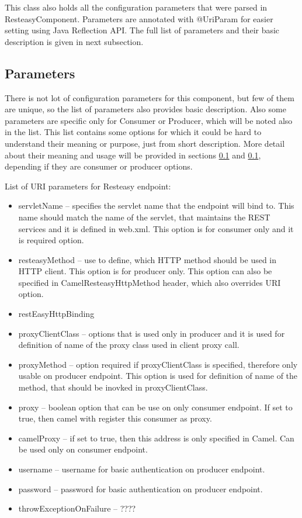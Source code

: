 \documentclass[12pt,final,oneside]{fithesis2}
\begin{document}
This class also holds all the configuration parameters that were parsed in ResteasyComponent. Parameters are annotated with @UriParam for easier setting using Java Reflection API. The full list of parameters and their basic description is given in next subsection.

\subsection{Parameters}
There is not lot of configuration parameters for this component, but few of them are unique, so the list of parameters also provides basic description. Also some parameters are specific only for Consumer or Producer, which will be noted also in the list. This list contains some options for which it could be hard to understand their meaning or purpose, just from short description. More detail about their meaning and usage will be provided in sections \ref{} and \ref{}, depending if they are consumer or producer options.  

List of URI parameters for Resteasy endpoint:
\begin{itemize}
\item
servletName -- specifies the servlet name that the endpoint will bind to. This name should match the name of the servlet, that maintains the REST services and it is defined in web.xml. This option is for consumer only and it is required option. 

\item
resteasyMethod -- use to define, which HTTP method should be used in HTTP client. This option is for producer only. This option can also be specified in CamelResteasyHttpMethod header, which also overrides URI option.

\item
restEasyHttpBinding

\item
proxyClientClass -- options that is used only in producer and it is used for definition of name of the proxy class used in client proxy call.

\item    
proxyMethod -- option required if proxyClientClass is specified, therefore only usable on producer endpoint. This option is used for definition of name of the method, that should be inovked in proxyClientClass.

\item
proxy -- boolean option that can be use on only consumer endpoint. If set to true, then camel with register this consumer as proxy. 

\item 
camelProxy -- if set to true, then this address is only specified in Camel. Can be used only on consumer endpoint.

\item
username -- username for basic authentication on producer endpoint.

\item
password -- password for basic authentication on producer endpoint.

\item
throwExceptionOnFailure -- ????
\end{itemize}
\end{document}
